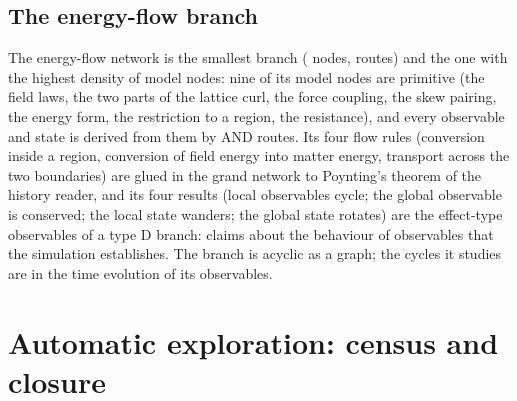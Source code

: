 \documentclass[11pt,a4paper,twoside,openany]{report}
\theoremstyle{plain}
\theoremstyle{definition}
\theoremstyle{remark}
\begin{document}
\section{The energy-flow branch}
The energy-flow network is the smallest branch (\NLGnodes{} nodes, \NLGroutes{} routes) and the one with the highest density of model nodes: nine of its model nodes are primitive (the field laws, the two parts of the lattice curl, the force coupling, the skew pairing, the energy form, the restriction to a region, the resistance), and every observable and state is derived from them by AND routes. Its four flow rules (conversion inside a region, conversion of field energy into matter energy, transport across the two boundaries) are glued in the grand network to Poynting's theorem of the history reader, and its four results (local observables cycle; the global observable is conserved; the local state wanders; the global state rotates) are the effect-type observables of a type D branch: claims about the behaviour of observables that the simulation establishes. The branch is acyclic as a graph; the cycles it studies are in the time evolution of its observables.

\chapter{Automatic exploration: census and closure}\label{ch:explore}
\end{document}
